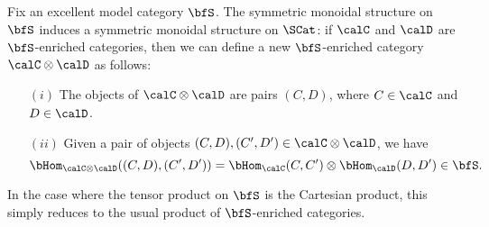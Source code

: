 



Fix an excellent model category $\bfS$. The symmetric monoidal structure on $\bfS$
induces a symmetric monoidal structure on $\SCat$:
if $\calC$ and $\calD$ are $\bfS$-enriched categories, then we can define a new
$\bfS$-enriched category $\calC \otimes \calD$ as follows:
\begin{itemize}
\item[$(i)$] The objects of $\calC \otimes \calD$ are pairs $(C,D)$, where
$C \in \calC$ and $D \in \calD$.
\item[$(ii)$] Given a pair of objects $(C,D), (C',D') \in \calC \otimes \calD$, we have
$$ \bHom_{\calC \otimes \calD}( (C,D), (C',D')) = \bHom_{\calC}(C,C') \otimes \bHom_{\calD}(D,D') \in \bfS.$$
\end{itemize}
In the case where the tensor product on $\bfS$ is the Cartesian product, this simply
reduces to the usual product of $\bfS$-enriched categories.

